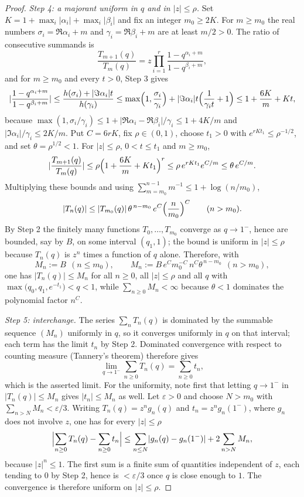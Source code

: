 \documentclass[11pt,oneside,openany]{book}
\theoremstyle{definition}
\theoremstyle{remark}
\newcommand{\eps}{\varepsilon}
\newcommand{\abs}[1]{\lvert #1\rvert}
\newcommand{\defeq}{\mathrel{:=}}
\begin{document}
\begin{proof}
\emph{Step 4: a majorant uniform in $q$ and in $\abs z\le\rho$.}
Set $K=1+\max_{i}\abs{\alpha_i}+\max_{i}\abs{\beta_i}$ and fix an integer $m_0\ge2K$.  For $m\ge m_0$ the real numbers $\sigma_i=\Re\alpha_i+m$ and $\gamma_i=\Re\beta_i+m$ are at least $m/2>0$.  The ratio of consecutive summands is
\[
 \frac{T_{m+1}(q)}{T_m(q)}
 =z\prod_{i=1}^{r}\frac{1-q^{\alpha_i+m}}{1-q^{\beta_i+m}},
\]
and for $m\ge m_0$ and every $t>0$, Step 3 gives
\[
 \abs{\frac{1-q^{\alpha_i+m}}{1-q^{\beta_i+m}}}
 \le\frac{h(\sigma_i)+\abs{\Im\alpha_i}t}{h(\gamma_i)}
 \le\max\Bigl(1,\frac{\sigma_i}{\gamma_i}\Bigr)
  +\abs{\Im\alpha_i}t\Bigl(\frac1{\gamma_it}+1\Bigr)
 \le1+\frac{6K}m+Kt,
\]
because $\max(1,\sigma_i/\gamma_i)\le1+\abs{\Re\alpha_i-\Re\beta_i}/\gamma_i\le1+4K/m$ and $\abs{\Im\alpha_i}/\gamma_i\le2K/m$.  Put $C=6rK$, fix $\rho\in(0,1)$, choose $t_1>0$ with $e^{rKt_1}\le\rho^{-1/2}$, and set $\theta=\rho^{1/2}<1$.  For $\abs z\le\rho$, $0<t\le t_1$ and $m\ge m_0$,
\[
 \abs{\frac{T_{m+1}(q)}{T_m(q)}}
 \le\rho\Bigl(1+\frac{6K}m+Kt_1\Bigr)^{r}
 \le\rho\,e^{rKt_1}e^{C/m}
 \le\theta\,e^{C/m}.
\]
Multiplying these bounds and using $\sum_{m=m_0}^{n-1}m^{-1}\le1+\log(n/m_0)$,
\[
 \abs{T_n(q)}\le\abs{T_{m_0}(q)}\,\theta^{\,n-m_0}\,e^{C}\Bigl(\frac n{m_0}\Bigr)^{C}
 \qquad(n>m_0).
\]
By Step 2 the finitely many functions $T_0,\dots,T_{m_0}$ converge as $q\to1^-$, hence are bounded, say by $B$, on some interval $(q_1,1)$; the bound is uniform in $\abs z\le\rho$ because $T_n(q)$ is $z^n$ times a function of $q$ alone.  Therefore, with
\[
 M_n\defeq B\ \ (n\le m_0),
 \qquad
 M_n\defeq B\,e^{C}m_0^{-C}\,n^{C}\theta^{\,n-m_0}\ \ (n>m_0),
\]
one has $\abs{T_n(q)}\le M_n$ for all $n\ge0$, all $\abs z\le\rho$ and all $q$ with $\max\bigl(q_0,q_1,e^{-t_1}\bigr)<q<1$, while $\sum_{n\ge0}M_n<\infty$ because $\theta<1$ dominates the polynomial factor $n^{C}$.

\emph{Step 5: interchange.}
The series $\sum_nT_n(q)$ is dominated by the summable sequence $(M_n)$ uniformly in $q$, so it converges uniformly in $q$ on that interval; each term has the limit $t_n$ by Step 2.  Dominated convergence with respect to counting measure (Tannery's theorem) therefore gives
\[
 \lim_{q\to1^-}\sum_{n\ge0}T_n(q)=\sum_{n\ge0}t_n,
\]
which is the asserted limit.  %
For the uniformity, note first that letting $q\to1^-$ in
$\abs{T_n(q)}\le M_n$ gives $\abs{t_n}\le M_n$ as well.  Let $\eps>0$ and
choose $N>m_0$ with $\sum_{n>N}M_n<\eps/3$.  Writing $T_n(q)=z^ng_n(q)$ and
$t_n=z^ng_n(1^-)$, where $g_n$ does not involve $z$, one has for every
$\abs z\le\rho$
\[
 \Bigl\lvert\sum_{n\ge0}T_n(q)-\sum_{n\ge0}t_n\Bigr\rvert
 \le\sum_{n\le N}\abs{g_n(q)-g_n(1^-)}+2\sum_{n>N}M_n,
\]
because $\abs z^n\le1$.  The first sum is a finite sum of quantities
independent of $z$, each tending to $0$ by Step 2, hence is $<\eps/3$ once
$q$ is close enough to $1$.  The convergence is therefore uniform on
$\abs z\le\rho$.
\end{proof}
\end{document}
